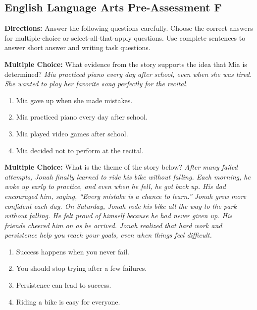 \documentclass[12pt]{article}
\begin{document}
\subsection*{English Language Arts Pre-Assessment F}
\onehalfspacing

\begin{tcolorbox}[colframe=black!50, colback=white, title=Assessment Directions]
\textbf{Directions:} Answer the following questions carefully. Choose the correct answers for multiple-choice or select-all-that-apply questions. Use complete sentences to answer short answer and writing task questions.
\end{tcolorbox}

\begin{tcolorbox}[colframe=black!50, colback=white, title=Question 1]
\textbf{Multiple Choice:} What evidence from the story supports the idea that Mia is determined?  
\textit{Mia practiced piano every day after school, even when she was tired. She wanted to play her favorite song perfectly for the recital.}  
\begin{enumerate}[label=(\Alph*)]
\item Mia gave up when she made mistakes.  
\item Mia practiced piano every day after school.  
\item Mia played video games after school.  
\item Mia decided not to perform at the recital.  
\end{enumerate}
\end{tcolorbox}

\begin{tcolorbox}[colframe=black!50, colback=white, title=Question 2]
\textbf{Multiple Choice:} What is the theme of the story below?  
\textit{After many failed attempts, Jonah finally learned to ride his bike without falling. Each morning, he woke up early to practice, and even when he fell, he got back up. His dad encouraged him, saying, “Every mistake is a chance to learn.” Jonah grew more confident each day. On Saturday, Jonah rode his bike all the way to the park without falling. He felt proud of himself because he had never given up. His friends cheered him on as he arrived. Jonah realized that hard work and persistence help you reach your goals, even when things feel difficult.}

\begin{enumerate}[label=(\Alph*)]
\item Success happens when you never fail.  
\item You should stop trying after a few failures.  
\item Persistence can lead to success.  
\item Riding a bike is easy for everyone.  
\end{enumerate}
\end{tcolorbox}
\end{document}
